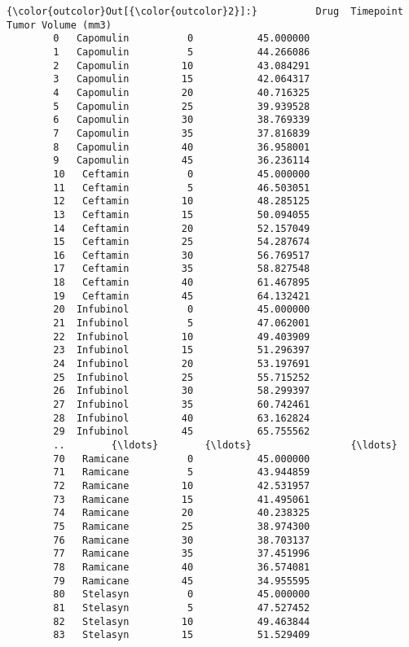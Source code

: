 \documentclass[11pt]{article}
\begin{document}
\begin{Verbatim}[commandchars=\\\{\}]
{\color{outcolor}Out[{\color{outcolor}2}]:}          Drug  Timepoint  Tumor Volume (mm3)
        0   Capomulin          0           45.000000
        1   Capomulin          5           44.266086
        2   Capomulin         10           43.084291
        3   Capomulin         15           42.064317
        4   Capomulin         20           40.716325
        5   Capomulin         25           39.939528
        6   Capomulin         30           38.769339
        7   Capomulin         35           37.816839
        8   Capomulin         40           36.958001
        9   Capomulin         45           36.236114
        10   Ceftamin          0           45.000000
        11   Ceftamin          5           46.503051
        12   Ceftamin         10           48.285125
        13   Ceftamin         15           50.094055
        14   Ceftamin         20           52.157049
        15   Ceftamin         25           54.287674
        16   Ceftamin         30           56.769517
        17   Ceftamin         35           58.827548
        18   Ceftamin         40           61.467895
        19   Ceftamin         45           64.132421
        20  Infubinol          0           45.000000
        21  Infubinol          5           47.062001
        22  Infubinol         10           49.403909
        23  Infubinol         15           51.296397
        24  Infubinol         20           53.197691
        25  Infubinol         25           55.715252
        26  Infubinol         30           58.299397
        27  Infubinol         35           60.742461
        28  Infubinol         40           63.162824
        29  Infubinol         45           65.755562
        ..        {\ldots}        {\ldots}                 {\ldots}
        70   Ramicane          0           45.000000
        71   Ramicane          5           43.944859
        72   Ramicane         10           42.531957
        73   Ramicane         15           41.495061
        74   Ramicane         20           40.238325
        75   Ramicane         25           38.974300
        76   Ramicane         30           38.703137
        77   Ramicane         35           37.451996
        78   Ramicane         40           36.574081
        79   Ramicane         45           34.955595
        80   Stelasyn          0           45.000000
        81   Stelasyn          5           47.527452
        82   Stelasyn         10           49.463844
        83   Stelasyn         15           51.529409

\end{Verbatim}
\end{document}
